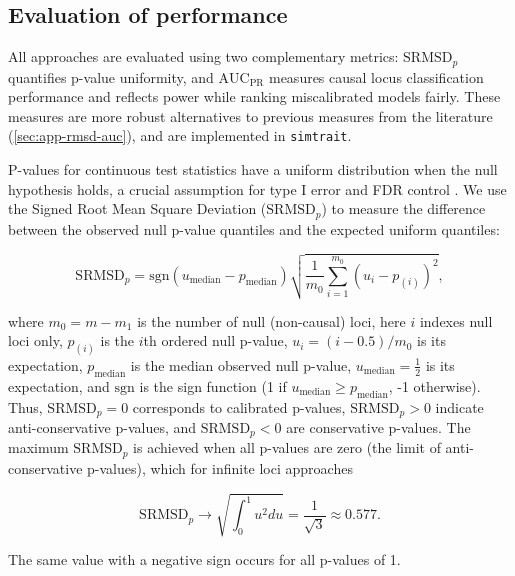 \documentclass[9pt,lineno]{elife}
\newcommand{\rmsd}{\text{SRMSD}_p}
\newcommand{\auc}{\text{AUC}_\text{PR}}
\begin{document}
\subsection{Evaluation of performance}

All approaches are evaluated using two complementary metrics: $\rmsd$ quantifies p-value uniformity, and $\auc$ measures causal locus classification performance and reflects power while ranking miscalibrated models fairly.
These measures are more robust alternatives to previous measures from the literature (\autoref{sec:app-rmsd-auc}), and are implemented in \texttt{simtrait}.

P-values for continuous test statistics have a uniform distribution when the null hypothesis holds, a crucial assumption for type I error and FDR control \citep{storey_positive_2003, storey_statistical_2003}.
We use the Signed Root Mean Square Deviation ($\rmsd$) to measure the difference between the observed null p-value quantiles and the expected uniform quantiles:
\begin{linenomath*}
  $$
  \rmsd
  =
  \text{sgn}(u_\text{median} - p_\text{median} ) \sqrt{ \frac{1}{m_0} \sum_{i = 1}^{m_0} \left( u_i - p_{(i)} \right)^2 },
  $$
\end{linenomath*}
where
$m_0 = m - m_1$ is the number of null (non-causal) loci,
here $i$ indexes null loci only,
$p_{(i)}$ is the $i$th ordered null p-value,
$u_i = ( i - 0.5 ) / m_0$ is its expectation,
$p_\text{median}$ is the median observed null p-value,
$u_\text{median} = \frac{1}{2}$ is its expectation,
and $\text{sgn}$ is the sign function (1 if $u_\text{median} \ge p_\text{median}$, -1 otherwise).
Thus, $\rmsd = 0$ corresponds to calibrated p-values, $\rmsd > 0$ indicate anti-conservative p-values, and $\rmsd < 0$ are conservative p-values.
The maximum $\rmsd$ is achieved when all p-values are zero (the limit of anti-conservative p-values), which for infinite loci approaches
\begin{linenomath*}
  $$
  \rmsd
  \rightarrow
  \sqrt{ \int_0^1 u^2 du }
  =
  \frac{1}{ \sqrt{ 3 } }
  \approx
  0.577
  .
  $$
\end{linenomath*}
The same value with a negative sign occurs for all p-values of 1.
\end{document}
